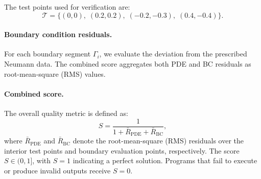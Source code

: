 The test points used for verification are:
\begin{equation}
\label{eq:test_points}
\mathcal{T} = \{(0,0),\; (0.2, 0.2),\; (-0.2, -0.3),\; (0.4, -0.4)\}.
\end{equation}

\paragraph{Boundary condition residuals.}
For each boundary segment $\Gamma_i$, we evaluate the deviation from the prescribed Neumann data. The combined score aggregates both PDE and BC residuals as root-mean-square (RMS) values.

\paragraph{Combined score.}
The overall quality metric is defined as:
\begin{equation}
\label{eq:combined_score}
S = \frac{1}{1 + \bar{R}_{\mathrm{PDE}} + \bar{R}_{\mathrm{BC}}},
\end{equation}
where $\bar{R}_{\mathrm{PDE}}$ and $\bar{R}_{\mathrm{BC}}$ denote the root-mean-square (RMS) residuals over the interior test points and boundary evaluation points, respectively. The score $S \in (0, 1]$, with $S = 1$ indicating a perfect solution. Programs that fail to execute or produce invalid outputs receive $S = 0$.
